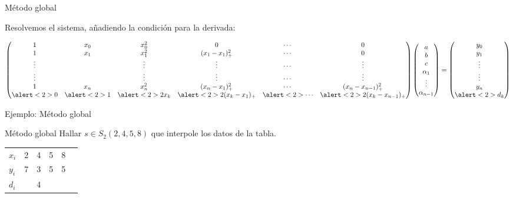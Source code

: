 \documentclass[compress]{beamer}
\theoremstyle{definition}
\begin{document}
\begin{frame}{Método global}

Resolvemos el sistema, añadiendo la condición para la derivada:

\begin{equation*}
\begin{pmatrix}
  1 & x_0 & x_0^2   & 0 & \cdots & 0\\
  1 & x_1 & x_1^2   & (x_1-x_1)_{+}^2 & \cdots & 0\\
  \vdots& & \vdots  & \vdots          & \cdots & \vdots \\
  \vdots& & \vdots  & \vdots          & \cdots & \vdots \\
  1 & x_n & x_n^2   & (x_n-x_1)_{+}^2 & \cdots & (x_n-x_{n-1})_{+}^2\\
  \alert<2>{0} &   \alert<2>{1} &  \alert<2>{2x_k} & \alert<2>{2(x_k-x_1)_{+}} & \alert<2>{\cdots} & \alert<2>{2(x_k-x_{n-1})_{+}}
\end{pmatrix}
\begin{pmatrix}
  a \\
  b \\
  c \\
  \alpha_1 \\
  \vdots \\
  \alpha_{n-1}
\end{pmatrix}
=
\begin{pmatrix}
  y_0\\
  y_1\\
  \vdots\\
  \vdots\\
  y_n\\
  \alert<2>{d_k}\\
\end{pmatrix}
\end{equation*}

\vspace{2pt}

\end{frame}

\begin{frame}{Ejemplo: Método global}
\begin{exampleblock}{Método global}
Hallar $s \in S_2(2,4,5,8)$ que interpole los datos de la tabla.
\begin{table}[h]
\centering
\begin{tabular}{l|ccccc}
$x_i$ & 2 & 4 & 5 & 8 \\
$y_i$ & 7 & 3 & 5 & 5 \\
$d_i$ &   & 4 &   &
\end{tabular}
\end{table}
\end{exampleblock}
\end{frame}
\end{document}
